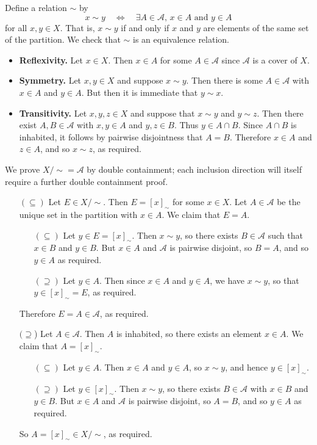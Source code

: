 \begin{cproof}[{of (b)}]
Define a relation $\sim$ by
\[ x \sim y \quad \Leftrightarrow \quad \exists A \in \mathcal{A},\, x \in A \text{ and } y \in A \]
for all $x,y \in X$. That is, $x \sim y$ if and only if $x$ and $y$ are elements of the same set of the partition. We check that $\sim$ is an equivalence relation.
\begin{itemize}
\item \textbf{Reflexivity.} Let $x \in X$. Then $x \in A$ for some $A \in \mathcal{A}$ since $\mathcal{A}$ is a cover of $X$.
\item \textbf{Symmetry.} Let $x,y \in X$ and suppose $x \sim y$. Then there is some $A \in \mathcal{A}$ with $x \in A$ and $y \in A$. But then it is immediate that $y \sim x$.
\item \textbf{Transitivity.} Let $x,y,z \in X$ and suppose that $x \sim y$ and $y \sim z$. Then there exist $A,B \in \mathcal{A}$ with $x,y \in A$ and $y,z \in B$. Thus $y \in A \cap B$. Since $A \cap B$ is inhabited, it follows by pairwise disjointness that $A=B$. Therefore $x \in A$ and $z \in A$, and so $x \sim z$, as required.
\end{itemize}

We prove $X/{\sim} = \mathcal{A}$ by double containment; each inclusion direction will itself require a further double containment proof.
\begin{itemize}
\item[$(\subseteq)$] Let $E \in X/{\sim}$. Then $E = [x]_{\sim}$ for some $x \in X$. Let $A \in \mathcal{A}$ be the unique set in the partition with $x \in A$. We claim that $E=A$.
\begin{itemize}[leftmargin=20pt]
\item[$(\subseteq)$] Let $y \in E = [x]_{\sim}$. Then $x \sim y$, so there exists $B \in \mathcal{A}$ such that $x \in B$ and $y \in B$. But $x \in A$ and $\mathcal{A}$ is pairwise disjoint, so $B=A$, and so $y \in A$ as required.
\item[$(\supseteq)$] Let $y \in A$. Then since $x \in A$ and $y \in A$, we have $x \sim y$, so that $y \in [x]_{\sim} = E$, as required.
\end{itemize}
Therefore $E = A \in \mathcal{A}$, as required.
\item[$(\supseteq$)] Let $A \in \mathcal{A}$. Then $A$ is inhabited, so there exists an element $x \in A$. We claim that $A = [x]_{\sim}$.
\begin{itemize}[leftmargin=20pt]
\item[$(\subseteq)$] Let $y \in A$. Then $x \in A$ and $y \in A$, so $x \sim y$, and hence $y \in [x]_{\sim}$.
\item[$(\supseteq)$] Let $y \in [x]_{\sim}$. Then $x \sim y$, so there exists $B \in \mathcal{A}$ with $x \in B$ and $y \in B$. But $x \in A$ and $\mathcal{A}$ is pairwise disjoint, so $A=B$, and so $y \in A$ as required.
\end{itemize}
So $A = [x]_{\sim} \in X/{\sim}$, as required.
\end{itemize}


\end{cproof}
